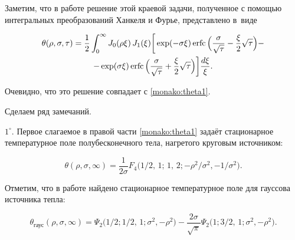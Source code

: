 
Заметим, что в работе \cite{manako:eger} решение этой краевой задачи, полученное с помощью интегральных преобразований Ханкеля и Фурье, представлено в~виде 

\begin{multline*}

\theta(\rho,\sigma,\tau)=\frac{1}{2}\int _0^\infty J_0(\rho\xi)\,J_1(\xi)\bigg[\exp(-\sigma\xi)\mathop{\rm erfc}\Big(\frac{\sigma}{\sqrt{\tau}}-\frac{\xi}{2}\sqrt{\tau}\Big) -\\-\exp(\sigma\xi)\mathop{\rm erfc}\Big(\frac{\sigma}{\sqrt{\tau}}+\frac{\xi}{2}\sqrt{\tau}\Big)\bigg]\frac{d\xi}{\xi}.

\end{multline*}

Очевидно, что это решение совпадает с  \eqref{monako:theta1}.



\smallskip



 Сделаем ряд замечаний. 



$1^\circ$. Первое слагаемое в правой части \eqref{monako:theta1} задаёт стационарное температурное поле полубесконечного тела, нагретого круговым источником:

\begin{equation}

\label{monako:16}

\theta (\rho,\sigma,\infty)=\frac{1}{2\sigma}F_4\big(1 / 2,\,1;\,1,\,2;{-\rho^2}/{\sigma^2},{-1}/{\sigma^2}\big).

\end{equation}

Отметим, что в работе \cite{manako:TVT} найдено стационарное температурное поле для гауссова источника тепла:

\begin{equation}

\label{monako:300}

\theta_{\text {гаус}}(\rho,\sigma,\infty)=\Psi_2\big(1 / 2;1 / 2,\,1;\sigma^2,-\rho^2\big)-\frac{2\sigma}{\sqrt{\pi}}\Psi_2\big(1;3 / 2,\,1;\sigma^2,-\rho^2\big).

\end{equation}



